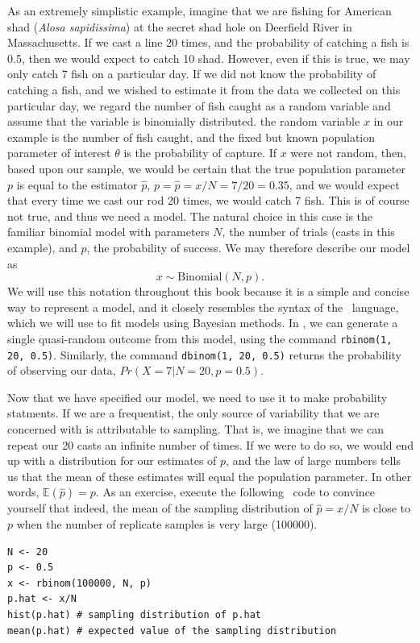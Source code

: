 As an extremely simplistic example, imagine that we are fishing for
American shad (\emph{Alosa sapidissima}) at the secret shad
hole on Deerfield River in Massachusetts.
If we cast a line 20 times, and the probability of
catching a fish is 0.5, then we would expect
to catch 10 shad. However, even if this is true, we may only catch 7
fish on a particular day.
If we did not know the probability of catching a fish, and we wished
to estimate it from the data we collected on this particular day, we
regard the number of fish caught as a random variable and assume that
the variable is binomially distributed. the random variable $x$ in our
example is the
number of fish caught, and the fixed but known population
parameter of interest $\theta$ is the probability of
capture. If $x$ were not random, then, based upon our sample, we would be
certain that the true population parameter $p$ is equal to the
estimator $\hat{p}$, $p = \hat{p} = x/N = 7/20 = 0.35$, and
we would expect that every
time we cast our rod 20 times, we would catch 7 fish. This is of
course not true, and thus we need a model. The natural
choice in this case is the familiar binomial model with parameters
$N$, the number of trials (casts in this example), and $p$, the
probability of success. We may therefore describe our model as
\[
x \sim \text{Binomial}(N, p).
\]
We will use this notation throughout this book because it is a simple
and concise way to represent a model, and it closely resembles the
syntax of the \bugs~language, which we will use to fit models using
Bayesian methods. In \R, we can generate a single quasi-random outcome from this
model, using the command \verb+rbinom(1, 20, 0.5)+. Similarly, the command
\verb+dbinom(1, 20, 0.5)+ returns
the probability of observing our data, $Pr(X=7 | N=20, p=0.5)$.

Now that we have specified our model, we need to use it to make
probability statments. If we are a frequentist, the only source of
variability that we are concerned with is attributable to
sampling. That is, we imagine that
we can repeat our 20 casts an infinite number of times. If we were
to do so, we would end up with a distribution for our estimates of $p$, and
the law of large numbers tells us that the mean of these estimates
will equal the population parameter. In other words,
$\mathbb{E}(\hat{p}) = p$. As an
exercise, execute the following
\R~code to convince yourself that indeed, the mean of the sampling
distribution of $\hat{p}=x/N$ is close to $p$ when the
number of replicate samples is very large (100000).
\begin{verbatim}
N <- 20
p <- 0.5
x <- rbinom(100000, N, p)
p.hat <- x/N
hist(p.hat) # sampling distribution of p.hat
mean(p.hat) # expected value of the sampling distribution
\end{verbatim}

